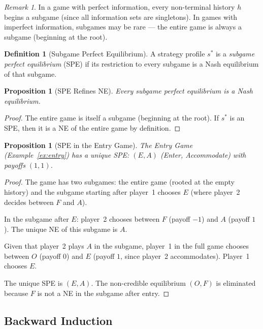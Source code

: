 \documentclass[11pt,a4paper]{article}
\theoremstyle{definition}
\newtheorem{definition}{Definition}[section]
\theoremstyle{plain}
\newtheorem{proposition}[theorem]{Proposition}
\theoremstyle{remark}
\newtheorem{remark}{Remark}[section]
\begin{document}
\begin{remark}
In a game with perfect information, every non-terminal history $h$ begins a subgame
(since all information sets are singletons). In games with imperfect information,
subgames may be rare --- the entire game is always a subgame (beginning at the root).
\end{remark}

\begin{definition}[Subgame Perfect Equilibrium]
\label{def:spe}
A strategy profile $s^*$ is a \emph{subgame perfect equilibrium} (SPE) if its
restriction to every subgame is a Nash equilibrium of that subgame.
\end{definition}

\begin{proposition}[SPE Refines NE]
\label{prop:spe_refines}
Every subgame perfect equilibrium is a Nash equilibrium.
\end{proposition}

\begin{proof}
The entire game is itself a subgame (beginning at the root). If $s^*$ is an SPE,
then it is a NE of the entire game by definition.
\end{proof}

\begin{proposition}[SPE in the Entry Game]
\label{prop:spe_entry}
The Entry Game (Example~\ref{ex:entry}) has a unique SPE: $(E, A)$ (Enter, Accommodate)
with payoffs $(1, 1)$.
\end{proposition}

\begin{proof}
The game has two subgames: the entire game (rooted at the empty history) and the
subgame starting after player~1 chooses $E$ (where player~2 decides between $F$ and $A$).

In the subgame after $E$: player~2 chooses between $F$ (payoff $-1$) and $A$ (payoff $1$).
The unique NE of this subgame is $A$.

Given that player~2 plays $A$ in the subgame, player~1 in the full game chooses between
$O$ (payoff $0$) and $E$ (payoff $1$, since player~2 accommodates). Player~1 chooses $E$.

The unique SPE is $(E, A)$. The non-credible equilibrium $(O, F)$ is eliminated because
$F$ is not a NE in the subgame after entry.
\end{proof}

\subsection{Backward Induction}
\label{subsec:backward_induction}
\end{document}
